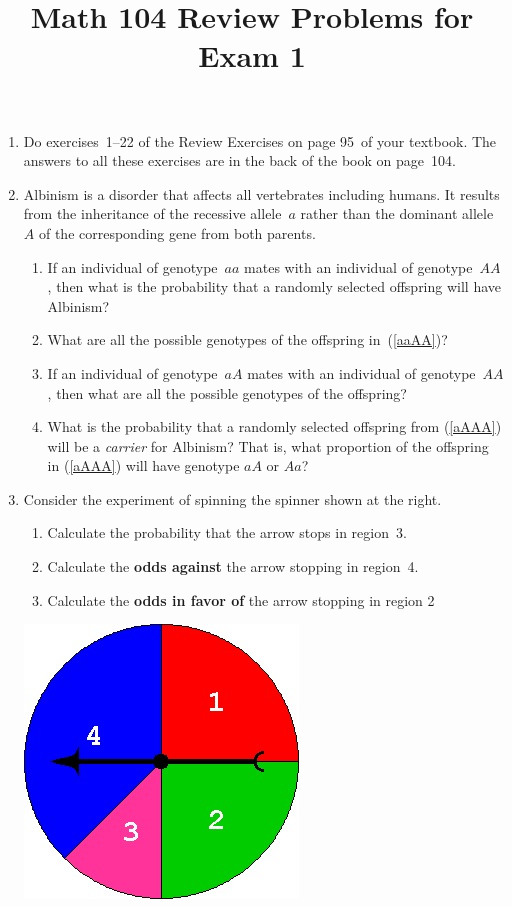 \documentclass[12pt]{article}
\author{}\date{}
\title{Math 104 Review Problems for Exam 1}\author{}
\begin{document}
\maketitle
\pagestyle{empty}
\begin{enumerate}
\item Do exercises~1--22 of the Review Exercises
on page 95~of your textbook.
The answers to all these exercises are in the
back of the book on page~104.
\item Albinism is a disorder that affects all vertebrates
including humans. It results from the inheritance
of the recessive allele~$a$ rather than the dominant
allele~$A$ of the corresponding gene from both parents.
\begin{enumerate}
\item\label{aaAA} If an individual of genotype~$aa$ mates with
an individual of genotype~$AA$, then what is the probability
that a randomly selected offspring will have Albinism?
\item What are all the possible genotypes of the offspring
in~(\ref{aaAA})?
\item\label{aAAA} If an individual of genotype~$aA$ mates with
an individual of genotype~$AA$, then
what are all the possible genotypes of the offspring?
\item What is the probability that a randomly selected
offspring from (\ref{aAAA})
will be a {\em carrier} for Albinism? That is,
what proportion of the offspring in  (\ref{aAAA})
will have genotype $aA$ or $Aa$?
\end{enumerate}

\item\label{Spinner}\begin{multicols}{2}
Consider the experiment of spinning the spinner
shown at the right.
\begin{enumerate}
\item Calculate the probability that the arrow stops
in region~3.
\item Calculate the {\bf odds against} the arrow stopping
in region~4.
\item Calculate the {\bf odds in favor of} the arrow
stopping in region 2
\end{enumerate}
\includegraphics[scale=.5]{R1Spinner}
\end{multicols}


\end{enumerate}
\end{document}
